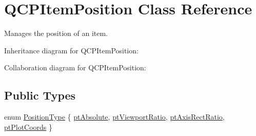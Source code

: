 \hypertarget{classQCPItemPosition}{}\section{Q\+C\+P\+Item\+Position Class Reference}
\label{classQCPItemPosition}


Manages the position of an item.  




Inheritance diagram for Q\+C\+P\+Item\+Position\+:


Collaboration diagram for Q\+C\+P\+Item\+Position\+:
\subsection*{Public Types}
\begin{DoxyCompactItemize}
\item 
enum \hyperlink{classQCPItemPosition_aad9936c22bf43e3d358552f6e86dbdc8}{Position\+Type} \{ \hyperlink{classQCPItemPosition_aad9936c22bf43e3d358552f6e86dbdc8a564f5e53e550ead1ec5fc7fc7d0b73e0}{pt\+Absolute}, 
\hyperlink{classQCPItemPosition_aad9936c22bf43e3d358552f6e86dbdc8ac7d6aa89ceacb39658b0d6da061c789a}{pt\+Viewport\+Ratio}, 
\hyperlink{classQCPItemPosition_aad9936c22bf43e3d358552f6e86dbdc8a01080fd00eaf09fa238ef6b73bbfef75}{pt\+Axis\+Rect\+Ratio}, 
\hyperlink{classQCPItemPosition_aad9936c22bf43e3d358552f6e86dbdc8ad5ffb8dc99ad73263f7010c77342294c}{pt\+Plot\+Coords}
 \}
\end{DoxyCompactItemize}
